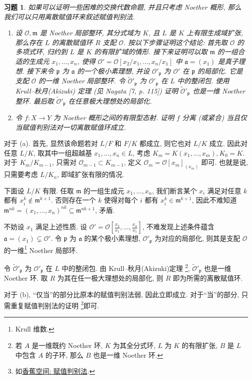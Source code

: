 \documentclass{article}
\makeatletter
\theoremstyle{exercise}
\newtheorem{exercise}{习题}[section]
\theoremstyle{plain}
\theoremstyle{remark}
\newenvironment{proofc}{\proof}{\endproof}
\def\printfootnotes{}
\def\ga{\mathfrak{a}}
\def\gp{\mathfrak{p}}
\def\gm{\mathfrak{m}}
\def\sO{\mathscr{O}}
\def\clearfootnotes{\def\@printfootnotes{}}
\makeatother
\begin{document}
\begin{exercise}
  如果可以证明一些困难的交换代数命题, 并且只考虑 Noether 概形,
  那么我们可以只用\emph{离散}赋值环来叙述赋值判别法.
  \begin{enumerate}[label=(\alph*)]
    \item 设 $\sO, \gm$ 是 Noether 局部整环, 其分式域为 $K$,
          且 $L$ 是 $K$ 上有限生成域扩张,
          那么存在 $L$ 的离散赋值环 $R$ 支配 $\sO$.
          按以下步骤证明这个结论:
          首先取 $\sO$ 的多项式环, 归约到 $L$ 是 $K$ 的有限扩域的情形.
          接下来证明可以取 $\gm$ 的一组合适的生成元 $x_1, \dots, x_n$,
          使得 $\sO' = \sO[x_2 / x_1, \dots, x_n / x_1]$ 中 $\ga = (x_1)$ 是真子理想.
          接下来令 $\gp$ 为 $\ga$ 的一个极小素理想, 并设 $\sO'_{\gp}$ 为 $\sO'$ 在 $\gp$ 的局部化.
          它是支配 $\sO$ 的一维 Noether 局部整环.
          令 $\tilde{\sO}'_{\gp}$ 为 $\sO'_{\gp}$ 在 $L$ 中的整闭包.
          使用 Krull--秋月(Akizuki) 定理 (见 Nagata [7, p. 115])
          证明 $\tilde{\sO}'_{\gp}$ 也是一维 Noether 整环.
          最后取 $\tilde{\sO}'_{\gp}$ 在任意极大理想处的局部化.
    \item 令 $f \colon X \to Y$ 为 Noether 概形之间的有限型态射.
          证明 $f$ 分离 (或紧合) 当且仅当赋值判别法对一切\emph{离散}赋值环成立.
  \end{enumerate}
\end{exercise}

\begin{proofc}
  对于 (a). 首先, 显然该命题若对 $L / F$ 和 $F / K$ 都成立, 则它也对 $L / K$ 成立.
  因此对任意 $L / K$, 取其中一组超越基 $x_1, \dots, x_n \in L$, 考虑 $K_m = K(x_1, \dots, x_m), K_0 = K$.
  对于 $K_m / K_{m - 1}$, 只需对 $\sO_{m - 1} \subset K_{m - 1}$, 定义 $\sO_m = \sO[x_m]_{(x_m)}$ 即可.
  也就是说, 只需要考虑 $L / K_n$, 即域扩张有限的情况.

  下面设 $L / K$ 有限.
  任取 $\gm$ 的一组生成元 $x_1, \dots, x_n$, 我们断言某个 $x_i$ 满足对任意 $k$ 都有 $x_i^k \notin \gm^{k+1}$.
  否则存在一个 $k$ 使得对每个 $i$ 都有 $x_i^k \in \gm^{k + 1}$,
  因此不难知道 $\gm^{nk} = (x_1, \dots, x_n)^{nk} \subseteq \gm^{nk+1}$, 矛盾.

  不妨设 $x_1$ 满足上述性质. 设 $\sO' = \sO[\frac{x_2}{x_1}, \dots, \frac{x_n}{x_1}]$,
  不难发现上述条件蕴含 $\ga = (x_1) \subsetneq \sO'$.
  令 $\gp$ 为 $\ga$ 的某个极小素理想, $\sO'_{\gp}$ 为对应的局部化, 则其是支配 $\sO$ 的一维\footnote{Krull 维数.} Noether 局部环.

  令 $\tilde{\sO}'_{\gp}$ 为 $\sO'_{\gp}$ 在 $L$ 中的整闭包. 由 Krull--秋月(Akizuki)定理
  \footnote{若 $A$ 是一维既约 Noether 环, $K$ 为其全分式环, $L$ 为 $K$ 的有限扩张, $B$ 是 $L$ 中包含 $A$ 的子环, 那么 $B$ 也是一维 Noether 环.},
  $\tilde{\sO}'_{\gp}$ 也是一维 Noether 环.
  取 $R$ 为其在任一极大理想处的局部化, 则 $R$ 即为所需的离散赋值环.

  对于 (b), ``仅当''的部分比原本的赋值判别法弱, 因此立即成立.
  对于``当''的部分, 只需重复赋值判别法的证明
  \footnote{如\href{https://www.bananaspace.org/wiki/赋值判别法}{香蕉空间: 赋值判别法}.}即可.\qedhere
  \printfootnotes
\end{proofc}
\clearfootnotes
\end{document}
